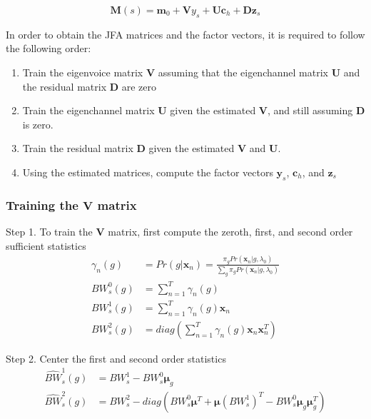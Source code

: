$$\bm{M}(s) = \bm{m}_0 + \bm{V}{y}_s + \bm{U}\bm{c}_h + \bm{D}\bm{z}_s$$

In order to obtain the JFA matrices and the factor vectors, it is required to follow the following order:
\begin{enumerate}
    \item Train the eigenvoice matrix $\bm{V}$ assuming that the eigenchannel matrix $\bm{U}$ and the residual matrix $\bm{D}$ are zero
    \item Train the eigenchannel matrix $\bm{U}$ given the estimated $\bm{V}$, and still assuming $\bm{D}$ is zero.
    \item Train the residual matrix $\bm{D}$ given the estimated $\bm{V}$ and $\bm{U}$.
    \item Using the estimated matrices, compute the factor vectors $\bm{y}_s$, $\bm{c}_h$, and $\bm{z}_s$
\end{enumerate}

\subsubsection{Training the $\bm{V}$ matrix}
Step 1. To train the $\bm{V}$ matrix, first compute the zeroth, first, and second order sufficient statistics
\begin{align*}
    \gamma_n (g) &= Pr(g | \bm{x}_n) = \frac{\pi_g Pr(\bm{x}_n | g, \lambda_0)}{\sum_g \pi_g Pr(\bm{x}_n | g, \lambda_0)}\\
    BW^0_s (g) &= \sum_{n=1}^T \gamma_n(g) \\
    BW^1_s (g) &= \sum_{n=1}^T \gamma_n(g) \bm{x}_n \\
    BW^2_s (g) &= diag\left(\sum_{n=1}^T \gamma_n(g) \bm{x}_n \bm{x}_n^T \right)
\end{align*}

Step 2. Center the first and second order statistics
\begin{align*}
    \hat{BW}^1_s (g) &= BW^1_s - BW^0_s \bm{\mu}_g \\
    \hat{BW}^2_s (g) &= BW^2_s - diag(BW^0_s \bm{\mu}^T + \bm{\mu} (BW^1_s)^T - BW^0_s \bm{\mu}_g \bm{\mu}_g^T)
\end{align*}

